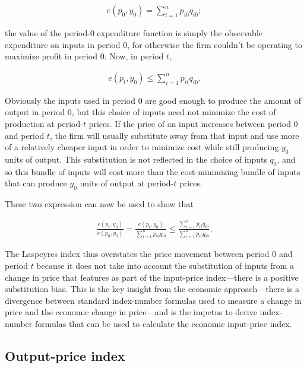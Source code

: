 \documentclass[]{article}
\begin{document}
\begin{align*}
e(p_{0}, y_{0}) = \sum_{i = 1}^{n} p_{i0} q_{i0};
\end{align*}

the value of the period-0 expenditure function is simply the observable expenditure on inputs in period 0, for otherwise the firm couldn't be operating to maximize profit in period 0. Now, in period \(t\),

\begin{align*}
e(p_{t}, y_{0}) \leq \sum_{i = 1}^{n} p_{it} q_{i0}.
\end{align*}

Obviously the inputs used in period 0 are good enough to produce the amount of output in period 0, but this choice of inputs need not minimize the cost of production at period-\(t\) prices. If the price of an input increases between period 0 and period \(t\), the firm will usually substitute away from that input and use more of a relatively cheaper input in order to minimize cost while still producing \(y_{0}\) units of output. This substitution is not reflected in the choice of inputs \(q_{0}\), and so this bundle of inputs will cost more than the cost-minimizing bundle of inputs that can produce \(y_{0}\) units of output at period-\(t\) prices.

These two expression can now be used to show that

\begin{align*}
\frac{e(p_{t}, y_{0})}{e(p_{0}, y_{0})} = \frac{e(p_{t}, y_{0})}{\sum_{i = 1}^{n} p_{i0} q_{i0}} \leq \frac{\sum_{i = 1}^{n} p_{it} q_{i0}}{\sum_{i = 1}^{n} p_{i0} q_{i0}}.
\end{align*}

The Laspeyres index thus overstates the price movement between period 0 and period \(t\) because it does not take into account the substitution of inputs from a change in price that features as part of the input-price index---there is a positive substitution bias. This is the key insight from the economic approach---there is a divergence between standard index-number formulas used to measure a change in price and the economic change in price---and is the impetus to derive index-number formulas that can be used to calculate the economic input-price index.

\hypertarget{output-price-index}{%
\subsection{Output-price index}\label{output-price-index}}
\end{document}
